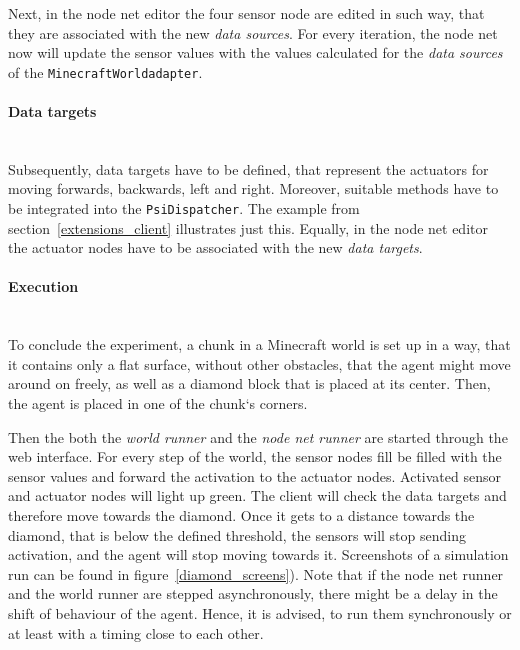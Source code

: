 Next, in the node net editor the four sensor node are edited in such way, that they are associated with the new \emph{data sources}. For every iteration, the node net now will update the sensor values with the values calculated for the \emph{data sources} of the \texttt{MinecraftWorldadapter}.

\paragraph{Data targets}$\;$ \\

Subsequently, data targets have to be defined, that represent the actuators for moving forwards, backwards, left and right. Moreover, suitable methods have to be integrated into the \texttt{PsiDispatcher}. The example from section~\ref{extensions_client} illustrates just this. Equally, in the node net editor the actuator nodes have to be associated with the new \emph{data targets}.

\paragraph{Execution}$\;$ \\

To conclude the experiment, a chunk in a Minecraft world is set up in a way, that it contains only a flat surface, without other obstacles, that the agent might move around on freely, as well as a diamond block that is placed at its center. Then, the agent is placed in one of the chunk`s corners.

Then the both the \emph{world runner} and the \emph{node net runner} are started through the web interface. For every step of the world, the sensor nodes fill be filled with the sensor values and forward the activation to the actuator nodes. Activated sensor and actuator nodes will light up green. The client will check the data targets and therefore move towards the diamond. Once it gets to a distance towards the diamond, that is below the defined threshold, the sensors will stop sending activation, and the agent will stop moving towards it. Screenshots of a simulation run can be found in figure~\ref{diamond_screens}). Note that if the node net runner and the world runner are stepped asynchronously, there might be a delay in the shift of behaviour of the agent. Hence, it is advised, to run them synchronously or at least with a timing close to each other.

